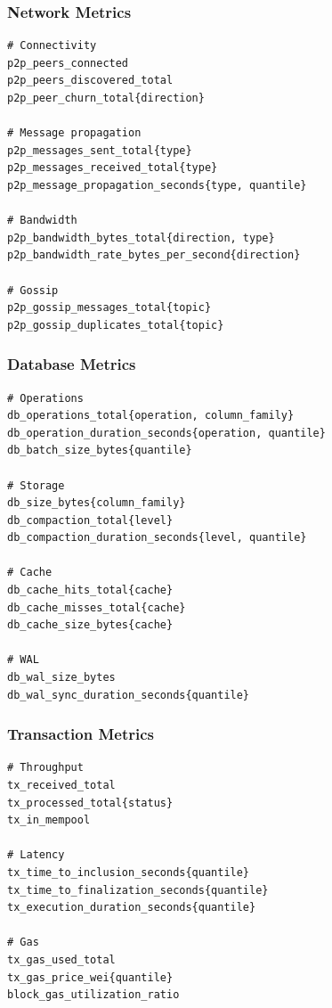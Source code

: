 \documentclass[11pt,a4paper]{article}
\begin{document}
\subsubsection{Network Metrics}

\begin{lstlisting}
# Connectivity
p2p_peers_connected
p2p_peers_discovered_total
p2p_peer_churn_total{direction}

# Message propagation
p2p_messages_sent_total{type}
p2p_messages_received_total{type}
p2p_message_propagation_seconds{type, quantile}

# Bandwidth
p2p_bandwidth_bytes_total{direction, type}
p2p_bandwidth_rate_bytes_per_second{direction}

# Gossip
p2p_gossip_messages_total{topic}
p2p_gossip_duplicates_total{topic}
\end{lstlisting}

\subsubsection{Database Metrics}

\begin{lstlisting}
# Operations
db_operations_total{operation, column_family}
db_operation_duration_seconds{operation, quantile}
db_batch_size_bytes{quantile}

# Storage
db_size_bytes{column_family}
db_compaction_total{level}
db_compaction_duration_seconds{level, quantile}

# Cache
db_cache_hits_total{cache}
db_cache_misses_total{cache}
db_cache_size_bytes{cache}

# WAL
db_wal_size_bytes
db_wal_sync_duration_seconds{quantile}
\end{lstlisting}

\subsubsection{Transaction Metrics}

\begin{lstlisting}
# Throughput
tx_received_total
tx_processed_total{status}
tx_in_mempool

# Latency
tx_time_to_inclusion_seconds{quantile}
tx_time_to_finalization_seconds{quantile}
tx_execution_duration_seconds{quantile}

# Gas
tx_gas_used_total
tx_gas_price_wei{quantile}
block_gas_utilization_ratio
\end{lstlisting}
\end{document}
